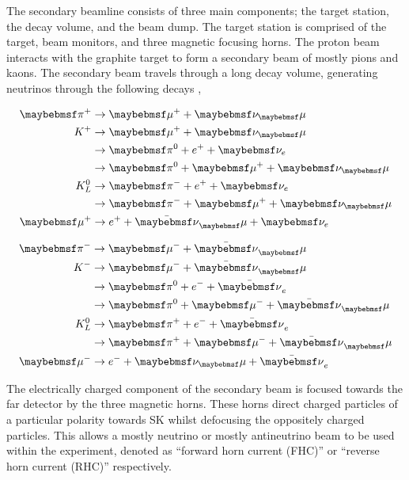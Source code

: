 The secondary beamline consists of three main components; the target station, the decay volume, and the beam dump. The target station is comprised of the target, beam monitors, and three magnetic focusing horns. The proton beam interacts with the graphite target to form a secondary beam of mostly pions and kaons. The secondary beam travels through a  long decay volume, generating neutrinos through the following decays \cite{Abe_2013},

\begin{minipage}{.45\linewidth}
  \begin{equation}
    \begin{split}
      \pi^+ &\rightarrow \mu^+ + \nu_\mu \\
      K^+ &\rightarrow \mu^+ + \nu_\mu \\
      &\rightarrow \pi^0 + e^+ + \nu_e \\
      &\rightarrow \pi^0 + \mu^+ + \nu_\mu \\
      K^0_L &\rightarrow \pi^- + e^+ + \nu_e \\
      &\rightarrow \pi^- + \mu^+ + \nu_\mu \\
      \mu^+ &\rightarrow e^+ + \bar{\nu}_\mu + \nu_e  \notag
    \end{split}
  \end{equation}
\end{minipage}%
\begin{minipage}{.45\linewidth}
  \begin{equation}
    \begin{split}
      \pi^- &\rightarrow \mu^- + \bar{\nu}_\mu\\
      K^- &\rightarrow \mu^- + \bar{\nu}_\mu \\
      &\rightarrow \pi^0 + e^- + \bar{\nu}_e\\
      &\rightarrow \pi^0 + \mu^- + \bar{\nu}_\mu \\
      K^0_L &\rightarrow \pi^+ + e^- + \bar{\nu}_e \\
      &\rightarrow \pi^+ + \mu^- + \bar{\nu}_\mu \\
      \mu^- &\rightarrow e^- + \nu_\mu + \bar{\nu}_e  \notag
    \end{split}
  \end{equation}
\end{minipage}

The electrically charged component of the secondary beam is focused towards the far detector by the three magnetic horns. These horns direct charged particles of a particular polarity towards SK whilst defocusing the oppositely charged particles. This allows a mostly neutrino or mostly antineutrino beam to be used within the experiment, denoted as ``forward horn current (FHC)'' or ``reverse horn current (RHC)'' respectively.

